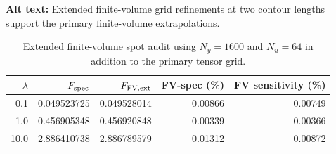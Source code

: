 \begin{table}[ht]
\centering
\caption{Extended finite-volume spot audit using $N_y=1600$ and $N_u=64$ in addition to the primary tensor grid.}
\par\raggedright\textbf{Alt text:} Extended finite-volume grid refinements at two contour lengths support the primary finite-volume extrapolations.\par\centering

\label{tab:fv_extended}
\begin{tabular}{rrrrr}
\toprule
$\lambda$ & $F_{\rm spec}$ & $F_{\rm FV,ext}$ & FV-spec (\%) & FV sensitivity (\%)\\
\midrule
0.1 & 0.049523725 & 0.049528014 & 0.00866 & 0.00749\\
1.0 & 0.456905348 & 0.456920848 & 0.00339 & 0.00366\\
10.0 & 2.886410738 & 2.886789579 & 0.01312 & 0.00872\\
\bottomrule
\end{tabular}
\end{table}
